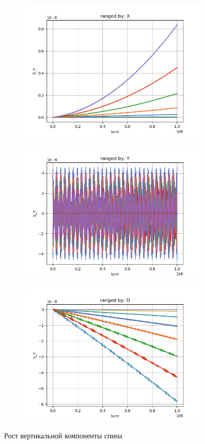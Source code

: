 \documentclass{article}
\begin{document}
\begin{figure}[!ht]
  \centering
  \begin{subfigure}[b]{1\textwidth}
    \includegraphics{img/S_Y_vs_iteration_1_ranged_X}
  \end{subfigure}
  \begin{subfigure}[b]{1\textwidth}
    \includegraphics{img/S_Y_vs_iteration_1_ranged_Y}
  \end{subfigure}
\end{figure}
\begin{figure}[!ht]\ContinuedFloat
  \begin{subfigure}[b]{1\textwidth}
    \includegraphics{img/S_Y_vs_iteration_1_ranged_D}
  \end{subfigure}
  \caption{Рост вертикальной компоненты спина}
\end{figure}
\end{document}

